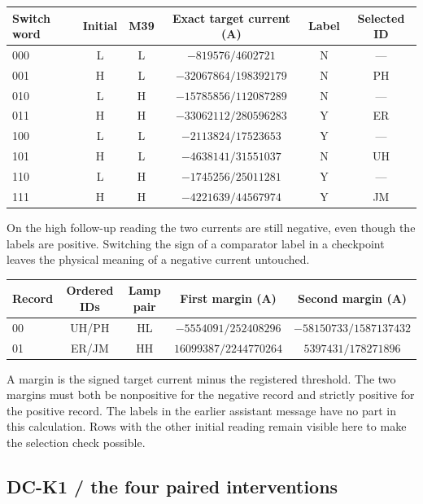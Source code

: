 \documentclass[12pt,letterpaper]{article}
\begin{document}
\begin{center}\small\begin{tabular}{@{}lccccc@{}}\toprule
Switch word & Initial & M39 & Exact target current (A) & Label & Selected ID\\\midrule
000 & L & L & $-819576/4602721$ & N & ---\\
001 & H & L & $-32067864/198392179$ & N & PH\\
010 & L & H & $-15785856/112087289$ & N & ---\\
011 & H & H & $-33062112/280596283$ & Y & ER\\
100 & L & L & $-2113824/17523653$ & Y & ---\\
101 & H & L & $-4638141/31551037$ & N & UH\\
110 & L & H & $-1745256/25011281$ & Y & ---\\
111 & H & H & $-4221639/44567974$ & Y & JM\\\bottomrule\end{tabular}\end{center}

On the high follow-up reading the two currents are still negative, even though the labels are positive. Switching the sign of a comparator label in a checkpoint leaves the physical meaning of a negative current untouched.

\begin{center}\small\begin{tabular}{@{}lcccc@{}}\toprule
Record & Ordered IDs & Lamp pair & First margin (A) & Second margin (A)\\\midrule
00 & UH/PH & HL & $-5554091/252408296$ & $-58150733/1587137432$\\
01 & ER/JM & HH & $16099387/2244770264$ & $5397431/178271896$\\\bottomrule\end{tabular}\end{center}

A margin is the signed target current minus the registered threshold. The two margins must both be nonpositive for the negative record and strictly positive for the positive record. The labels in the earlier assistant message have no part in this calculation. Rows with the other initial reading remain visible here to make the selection check possible.

\clearpage\subsection{DC-K1 / the four paired interventions}
\end{document}
